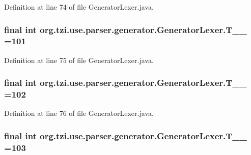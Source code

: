 Definition at line 74 of file Generator\-Lexer.\-java.

\hypertarget{classorg_1_1tzi_1_1use_1_1parser_1_1generator_1_1_generator_lexer_aeb956fcbb9d1bcce4a7c3b937c4554fe}{
\subsubsection[{T\-\_\-\-\_\-101}]{\setlength{\rightskip}{0pt plus 5cm}final int org.\-tzi.\-use.\-parser.\-generator.\-Generator\-Lexer.\-T\-\_\-\-\_ =101\hspace{0.3cm}{\ttfamily [static]}}}\label{classorg_1_1tzi_1_1use_1_1parser_1_1generator_1_1_generator_lexer_aeb956fcbb9d1bcce4a7c3b937c4554fe}


Definition at line 75 of file Generator\-Lexer.\-java.

\hypertarget{classorg_1_1tzi_1_1use_1_1parser_1_1generator_1_1_generator_lexer_a46e22b7496d46d68a1581769a5c82496}{
\subsubsection[{T\-\_\-\-\_\-102}]{\setlength{\rightskip}{0pt plus 5cm}final int org.\-tzi.\-use.\-parser.\-generator.\-Generator\-Lexer.\-T\-\_\-\-\_ =102\hspace{0.3cm}{\ttfamily [static]}}}\label{classorg_1_1tzi_1_1use_1_1parser_1_1generator_1_1_generator_lexer_a46e22b7496d46d68a1581769a5c82496}


Definition at line 76 of file Generator\-Lexer.\-java.

\hypertarget{classorg_1_1tzi_1_1use_1_1parser_1_1generator_1_1_generator_lexer_a5ef3ca34a41c0900f06f03001f070085}{
\subsubsection[{T\-\_\-\-\_\-103}]{\setlength{\rightskip}{0pt plus 5cm}final int org.\-tzi.\-use.\-parser.\-generator.\-Generator\-Lexer.\-T\-\_\-\-\_ =103\hspace{0.3cm}{\ttfamily [static]}}}\label{classorg_1_1tzi_1_1use_1_1parser_1_1generator_1_1_generator_lexer_a5ef3ca34a41c0900f06f03001f070085}


